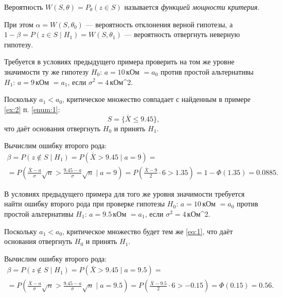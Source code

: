 \begin{definition}
Вероятность $W(S, \theta) = P_\theta(z\in S)$ называется \emph{функцией мощности
критерия}.
\end{definition}

При этом $ \alpha = W(S, \theta_0) $ --- вероятность отклонения верной гипотезы,
а $ 1-\beta = P(z \in S \mid H_1) = W(S, \theta_1) $ --- вероятность отвергнуть
неверную гипотезу.

\begin{ex}
	Требуется в условиях предыдущего примера проверить на том же уровне значимости
	ту же гипотезу $ H_0 $: $ a = 10 $\,кОм $ = a_0 $ против простой альтернативы
	$ H_1 $: $ a = 9 $\,кОм $ = a_1 $, если $ \sigma^2 = 4 $\,кОм^2. 

	\begin{solution}
		Поскольку $ a_1 < a_0 $, критическое множество совпадает с найденным в
		примере \ref{ex:2} п. \ref{enum:1}:  
		\begin{equation}\label{eq:1}
			S = \{\bar X \leqslant 9.45\},
		\end{equation}
		что даёт основания отвергнуть $ H_0 $ и принять $ H_1 $. 

		Вычислим ошибку	второго рода: 
		\begin{multline*}
				\beta = P(z \notin S \mid H_1) = P(\bar X > 9.45 \mid a = 9) =\\= P \left(
				\frac{\bar X - a}{\sigma}\sqrt n > \frac{9.45 - a}{\sigma}\sqrt n \mid a
			= 9\right) = P \left( \frac{\bar X - 9}{2} \cdot 6 > 1.35 \right) = 1 -
			\Phi(1.35) = 0.0885.
		\end{multline*}

	\end{solution}
\end{ex}
\begin{ex}
	В условиях предыдущего примера для того же уровня значимости требуется найти
	ошибку второго рода при проверке гипотезы $ H_0 $: $ a =10 $\,кОм $ = a_0 $
	против простой альтернативы $ H_1 $: $ a = 9.5 $\,кОм $ = a_1 $, если $
	\sigma^2 = 4 $\,кОм^2.

	\begin{solution}
		Поскольку $ a_1 < a_0 $, критическое множество будет тем же \eqref{eq:1},
		что даёт основания отвергнуть $ H_0 $ и принять $ H_1 $.

		Вычислим ошибку второго рода: 
		\begin{multline*}
				\beta = P(z\notin S\mid H_1) = P(\bar X > 9.45 \mid a = 9.5) =\\=
				P \left(
				\frac{\bar X - a}{\sigma}\sqrt n> \frac{9.45 - a}{\sigma} \sqrt n\mid a
			= 9.5\right) = P \left( \frac{\bar X - 9.5}{2}\cdot 6 > -0.15 \right) =
			\Phi(0.15) = 0.56.
		\end{multline*}
	\end{solution}	
\end{ex}
